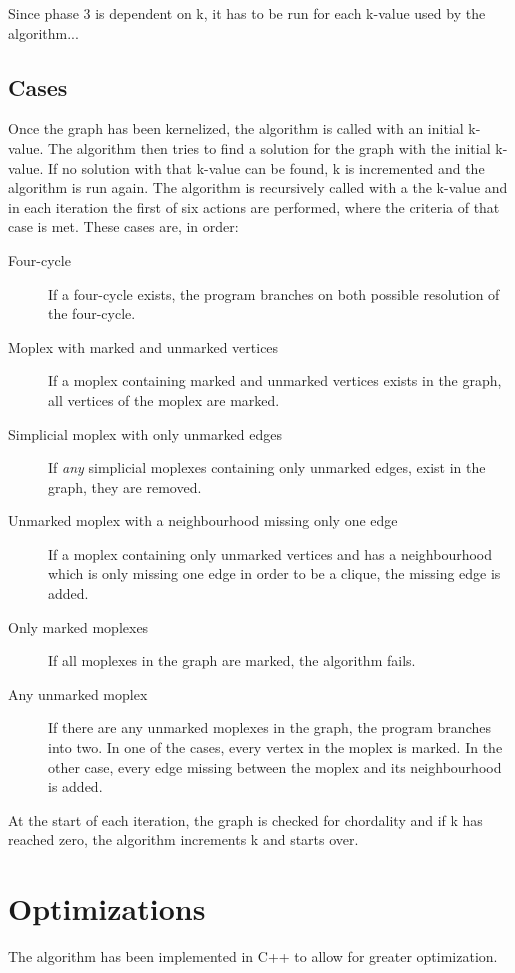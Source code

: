 \documentclass{article}
\begin{document}
		Since phase 3 is dependent on k, it has to be run for each k-value used by the algorithm...

		\subsection{Cases} 
		Once the graph has been kernelized, the algorithm is called with an initial k-value. The algorithm then tries to find a solution for the graph with the initial k-value.
		If no solution with that k-value can be found, k is incremented and the algorithm is run again.
		The algorithm is recursively called with a the k-value and in each iteration the first of six actions are performed, where the criteria of that case is met.
		These cases are, in order:
		\begin{description}
			\item[Four-cycle] If a four-cycle exists, the program branches on both possible resolution of the four-cycle.
			\item[Moplex with marked and unmarked vertices] If a moplex containing marked and unmarked vertices exists in the graph, all vertices of the moplex are marked.
			\item[Simplicial moplex with only unmarked edges] If \emph{any} simplicial moplexes containing only unmarked edges, exist in the graph, they are removed.
			\item[Unmarked moplex with a neighbourhood missing only one edge] If a moplex containing only unmarked vertices and has a neighbourhood which is only missing one edge in order to be a clique, the missing edge is added.
			\item[Only marked moplexes] If all moplexes in the graph are marked, the algorithm fails.
			\item[Any unmarked moplex] If there are any unmarked moplexes in the graph, the program branches into two. In one of the cases, every vertex in the moplex is marked. In the other case, every edge missing between the moplex and its neighbourhood is added.
		\end{description}

		At the start of each iteration, the graph is checked for chordality and if k has reached zero, the algorithm increments k and starts over.

	\section{Optimizations}
	The algorithm has been implemented in C++ to allow for greater optimization.
\end{document}
